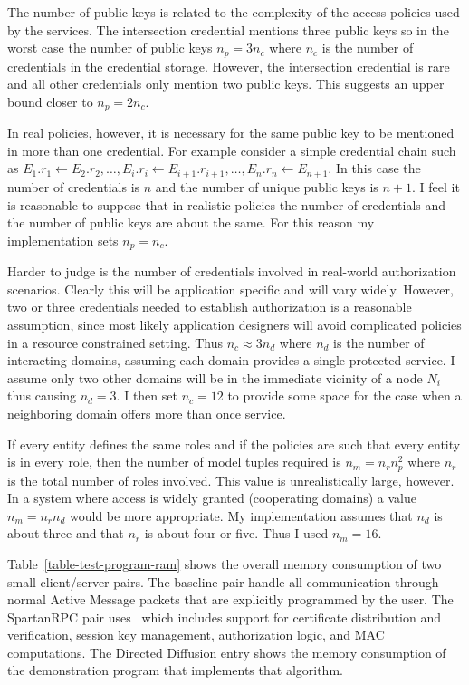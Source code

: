 The number of public keys is related to the complexity of the access policies used by the
services. The intersection credential mentions three public keys so in the worst case the number
of public keys $n_p = 3 n_c$ where $n_c$ is the number of credentials in the credential storage.
However, the intersection credential is rare and all other credentials only mention two public
keys. This suggests an upper bound closer to $n_p = 2 n_c$.

In real policies, however, it is necessary for the same public key to be mentioned in more than
one credential. For example consider a simple credential chain such as $E_1.r_1 \leftarrow
E_2.r_2, \ldots, E_i.r_i \leftarrow E_{i+1}.r_{i+1}, \ldots, E_n.r_n \leftarrow E_{n+1}$. In this
case the number of credentials is $n$ and the number of unique public keys is $n+1$. I feel it
is reasonable to suppose that in realistic policies the number of credentials and the number of
public keys are about the same. For this reason my implementation sets $n_p = n_c$.

Harder to judge is the number of credentials involved in real-world authorization scenarios.
Clearly this will be application specific and will vary widely. However, two or three
credentials needed to establish authorization is a reasonable assumption, since most likely
application designers will avoid complicated policies in a resource constrained setting. Thus
$n_c \approx 3 n_d$ where $n_d$ is the number of interacting domains, assuming each domain
provides a single protected service. I assume only two other domains will be in the immediate
vicinity of a node $N_i$ thus causing $n_d = 3$. I then set $n_c = 12$ to provide some space for
the case when a neighboring domain offers more than once service.

If every entity defines the same roles and if the policies are such that every entity is in
every role, then the number of model tuples required is $n_m = n_r n_p^2$ where $n_r$ is the
total number of roles involved. This value is unrealistically large, however. In a system where
access is widely granted (cooperating domains) a value $n_m = n_r n_d$ would be more
appropriate. My implementation assumes that $n_d$ is about three and that $n_r$ is about four or
five. Thus I used $n_m = 16$.

Table~\ref{table-test-program-ram} shows the overall memory consumption of two small
client/server pairs. The baseline pair handle all communication through normal Active Message
packets that are explicitly programmed by the user. The SpartanRPC pair uses \Sprocket\ which
includes support for certificate distribution and verification, session key management,
authorization logic, and MAC computations. The Directed Diffusion entry shows the memory
consumption of the demonstration program that implements that algorithm.

